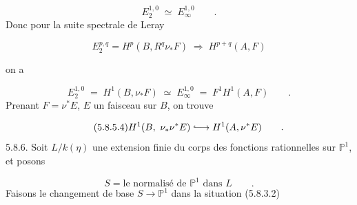 \begin{equation}\tag{5.8.5.2}
E_2^{1,0} \;\simeq\; E_\infty^{1,0} \qquad .
\end{equation}
Donc pour la suite spectrale de Leray 

\begin{equation*}
E_2^{p,q} = H^p(B,R^q\nu_*F) \;\Longrightarrow\; H^{p+q}(A,F)
\end{equation*}


 on a

\begin{equation}\tag{5.8.5.3}
E_2^{1,0} \;=\; H^1(B,\nu_*F) \;\simeq\; E_\infty^{1,0} \;=\; F^1H^1(A,F) \qquad .
\end{equation}
Prenant $F = \nu^*E$, $E$ un faisceau sur $B$, on trouve

\begin{equation}\tag{5.8.5.4}
H^1(B,\ \nu_*\nu^*E) \lhook\joinrel\longrightarrow H^1(A,\nu^*E) \qquad .
\end{equation}
5.8.6. Soit $L/k(\eta)$ une extension finie du corps des fonctions rationnelles sur $\mathbb{P}^1$, et posons

\begin{equation}\tag{5.8.6.1}
S = \text{le normalisé de } \mathbb{P}^1 \text{ dans } L \qquad .
\end{equation}
Faisons le changement de base $S \longrightarrow \mathbb{P}^1$ dans la situation (5.8.3.2)

